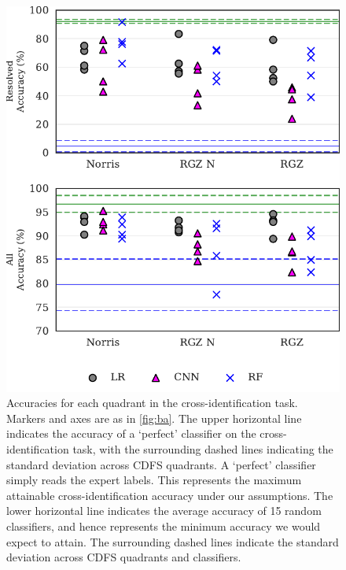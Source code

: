 \documentclass[fleqn,usenatbib,usedcolumn]{mnras}
\begin{document}
  \begin{figure}
    \centering
    \includegraphics[width=\columnwidth]{images/cdfs_cross_identification_grid.pdf}
    \caption{Accuracies for each quadrant in the cross-identification
      task. Markers and axes are as in \autoref{fig:ba}. The upper horizontal line
      indicates the accuracy of a `perfect' classifier on the cross-identification
      task, with the surrounding dashed lines indicating the standard deviation
      across CDFS quadrants. A `perfect' classifier simply reads the expert
      labels. This represents the maximum attainable cross-identification accuracy
      under our assumptions. The lower horizontal line indicates the average
      accuracy of 15 random classifiers, and hence represents the minimum accuracy
      we would expect to attain. The surrounding dashed lines indicate the
      standard deviation across CDFS quadrants and classifiers.
      \label{fig:cross-id-accuracy}}
  \end{figure}
\end{document}
